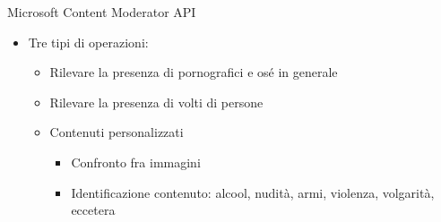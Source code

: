 %
\begin{frame}[t]{Microsoft Content Moderator API}
\begin{itemize}
	\item Tre tipi di operazioni:
	\begin{itemize}
		\item Rilevare la presenza di pornografici e osé in generale
		\item Rilevare la presenza di volti di persone
		\item Contenuti personalizzati
		\begin{itemize}
			\item Confronto fra immagini
			\item Identificazione contenuto: alcool, nudità, armi, violenza, volgarità, eccetera
		\end{itemize}
	\end{itemize}
\end{itemize}
\end{frame}
%

